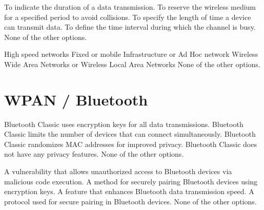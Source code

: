 \begin{questions}
    \begin{checkboxes}
        \choice To indicate the duration of a data transmission.
        \CorrectChoice To reserve the wireless medium for a specified period to avoid collisions.
        \choice To specify the length of time a device can transmit data.
        \choice To define the time interval during which the channel is busy.
        \choice None of the other options.
    \end{checkboxes}

    \begin{checkboxes}
        \choice High speed networks
        \CorrectChoice Fixed or mobile
        \CorrectChoice Infrastructure or Ad Hoc network
        \CorrectChoice Wireless Wide Area Networks or Wireless Local Area Networks
        \choice None of the other options.
    \end{checkboxes}

    \section{WPAN / Bluetooth}

    \begin{checkboxes}
        \choice Bluetooth Classic uses encryption keys for all data transmissions.
        \choice Bluetooth Classic limits the number of devices that can connect simultaneously.
        \choice Bluetooth Classic randomizes MAC addresses for improved privacy.
        \choice Bluetooth Classic does not have any privacy features.
        \choice None of the other options.
    \end{checkboxes}

    \begin{checkboxes}
        \choice A vulnerability that allows unauthorized access to Bluetooth devices via malicious code execution.
        \choice A method for securely pairing Bluetooth devices using encryption keys.
        \choice A feature that enhances Bluetooth data transmission speed.
        \choice A protocol used for secure pairing in Bluetooth devices.
        \CorrectChoice None of the other options.
    \end{checkboxes}


\end{questions}
